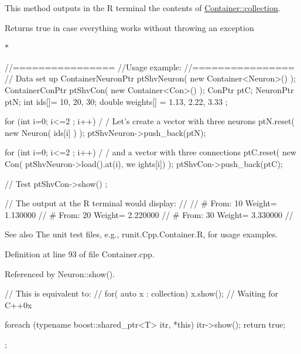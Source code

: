 This method outputs in the R terminal the contents of \hyperlink{class_container_aef055b4e4f94e227cc8a2124af13c177}{Container::collection}. \begin{DoxyReturn}{Returns}
true in case everything works without throwing an exception
\end{DoxyReturn}
$\ast$ 
\begin{DoxyCode}
                //================
                //Usage example:
                //================
                // Data set up
                        ContainerNeuronPtr      ptShvNeuron( new 
      Container<Neuron>() );
                        ContainerConPtr ptShvCon( new Container<Con>() );
                        ConPtr  ptC;
                        NeuronPtr ptN;
                        int ids[]= {10, 20, 30};
                        double weights[] = {1.13, 2.22, 3.33 };

                        for (int i=0; i<=2 ; i++) {                             /
      / Let's create a vector with three neurons
                                ptN.reset( new Neuron( ids[i] ) );
                                ptShvNeuron->push_back(ptN);
                        }

                        for (int i=0; i<=2 ; i++) {                             /
      / and a vector with three connections
                                ptC.reset( new Con( ptShvNeuron->load().at(i), we
      ights[i]) );
                                ptShvCon->push_back(ptC);
                        }

                // Test
                        ptShvCon->show() ;

                // The output at the R terminal would display:
                //
                //      # From:  10      Weight=         1.130000
                //      # From:  20      Weight=         2.220000
                //      # From:  30      Weight=         3.330000
                //
\end{DoxyCode}


\begin{DoxySeeAlso}{See also}
The unit test files, e.g., runit.Cpp.Container.R, for usage examples. 
\end{DoxySeeAlso}


Definition at line 93 of file Container.cpp.



Referenced by Neuron::show().


\begin{DoxyCode}
                                              {

        // This is equivalent to:
        // for( auto x : collection) { x.show(); }
        // Waiting for C++0x

        foreach (typename boost::shared_ptr<T> itr, *this){
                itr->show();
        }
        return true;
};
\end{DoxyCode}


